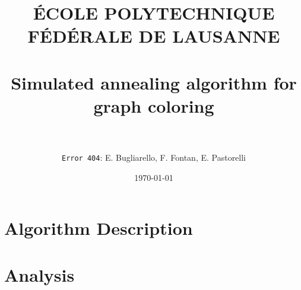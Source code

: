 \documentclass[paper=a4,fontsize=11pt]{article} %
\title{	
	\normalfont \normalsize 
	\textsc{\LARGE \'{E}COLE POLYTECHNIQUE F\'{E}D\'{E}RALE DE LAUSANNE}\\[1.7cm] %
	\vspace{-1cm}
	\horrule{0.5pt} \\[0.4cm] %
	\LARGE Simulated annealing algorithm for graph coloring \\ %
	\horrule{2pt} \\[0.5cm] %
}
\author{\LARGE\texttt{Error 404}\Large: E. Bugliarello, F. Fontan, E. Pastorelli} %
\date{\normalsize\today} %
\numberwithin{equation}{section} %
\numberwithin{figure}{section} %
\numberwithin{table}{section} %
\begin{document}

	\maketitle %
	
	
	\section{Algorithm Description}
	 
	\newpage
	\section{Analysis}
	
	
	
\end{document}
